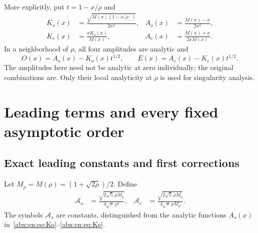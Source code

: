 \documentclass[11pt,letterpaper]{article}
\numberwithin{equation}{section}
\theoremstyle{remark}\newtheorem{remark}[theorem]{Remark}
\begin{document}
More explicitly, put $t=1-x/\rho$ and
\begin{align}
 K_o(x)&=\frac{\sqrt{M(x)(1-x/\rho_-)}}{2x^2},&
 A_o(x)&=\frac{M(x)-x}{2x^2},\label{abx:en:eq:Ko}\\
 K_e(x)&=\frac{xK_o(x)}{M(x)},&
 A_e(x)&=\frac{M(x)+x}{2xM(x)}.\label{abx:en:eq:Ke}
\end{align}
In a neighborhood of $\rho$, all four amplitudes are analytic and
\begin{equation}\label{abx:en:eq:local}
 O(x)=A_o(x)-K_o(x)t^{1/2},\qquad
 E(x)=A_e(x)-K_e(x)t^{1/2}.
\end{equation}
The amplitudes here need not be analytic at zero individually; the
original combinations are. Only their local analyticity at $\rho$ is
used for singularity analysis.

\section{Leading terms and every fixed asymptotic order}\label{abx:en:sec:asymptotics}
\subsection{Exact leading constants and first corrections}\label{abx:en:sub:leading}
Let $M_\rho=M(\rho)=(1+\sqrt{2\rho})/2$. Define
\begin{align}
 \mathcal A_o&=\frac{\sqrt{2\sqrt5\,\rho M_\rho}}
                    {4\sqrt\pi\,\rho^2},&
 \mathcal A_e&=\frac{\sqrt{2\sqrt5\,\rho M_\rho}}
                    {4\sqrt\pi\,\rho M_\rho}.
 \label{abx:en:eq:amplitudes}
\end{align}
The symbols $\mathcal A_s$ are constants, distinguished from the
analytic functions $A_s(x)$ in~\eqref{abx:en:eq:Ko}--\eqref{abx:en:eq:Ke}.
\end{document}
